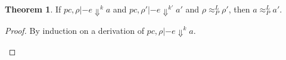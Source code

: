 \documentclass{article}
\makeatletter
\newcommand{\at}{\ensuremath{{\scriptstyle{@}}}}
\newcommand{\pc}{\ensuremath{{\mathit{pc}}}}
\theoremstyle{definition}
\newtheorem{theorem}{Theorem}
\makeatother
\begin{document}
\pagebreak

\begin{theorem}
  If $\pc, \rho |- e \Downarrow^{k} a$ and
  $\pc, \rho' |- e \Downarrow^{k'} a'$
  and $\rho \approx^{L}_{P} \rho'$, then
  $a \approx^{L}_{P} a'$.
\end{theorem}
\begin{proof}
  By induction on a derivation of $\pc, \rho |- e \Downarrow^{k} a$.
  \begin{description}

\end{description}
\end{proof}
\end{document}
